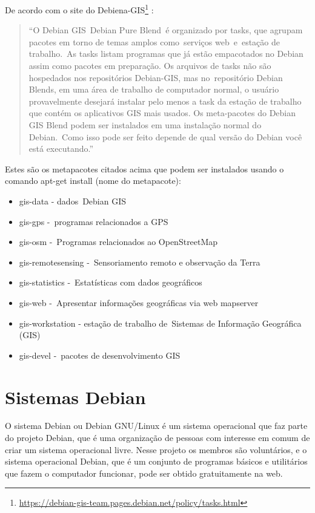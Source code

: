 De acordo com o site do Debiena-GIS\footnote{\url{https://debian-gis-team.pages.debian.net/policy/tasks.html}} \cite{bib:gis}:

\begin{quote}
	``O Debian GIS Debian Pure Blend é organizado por tasks, que agrupam pacotes em torno de temas amplos como serviços web e estação de trabalho. As tasks listam programas que já estão empacotados no Debian assim como pacotes em preparação. Os arquivos de tasks não são hospedados nos repositórios Debian-GIS, mas no repositório Debian Blends, em uma área de trabalho de computador normal, o usuário provavelmente desejará instalar pelo menos a task da estação de trabalho que contém os aplicativos GIS mais usados. Os meta-pacotes do Debian GIS Blend podem ser instalados em uma instalação normal do Debian. Como isso pode ser feito depende de qual versão do Debian você está executando.''  
\end{quote}

Estes são os metapacotes citados acima que podem ser instalados usando o comando apt-get install (nome do metapacote):

\begin{itemize}
	\item gis-data - dados Debian GIS
	\item gis-gps - programas relacionados a GPS
	\item gis-osm - Programas relacionados ao OpenStreetMap
	\item gis-remotesensing - Sensoriamento remoto e observação da Terra
	\item gis-statistics - Estatísticas com dados geográficos
	\item gis-web - Apresentar informações geográficas via web mapserver
	\item gis-workstation - estação de trabalho de Sistemas de Informação Geográfica (GIS)
	\item gis-devel - pacotes de desenvolvimento GIS

\end{itemize}

\section{Sistemas Debian}
O sistema Debian ou Debian GNU/Linux é um sistema operacional que faz parte do projeto Debian, que é uma organização de pessoas com interesse em comum de criar um sistema operacional livre. Nesse projeto os membros são voluntários, e o sistema operacional Debian, que é um conjunto de programas básicos e utilitários que fazem o computador funcionar, pode ser obtido gratuitamente na web.

